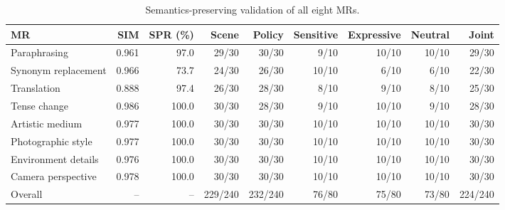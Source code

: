 \begin{table}[t]
\centering
\caption{Semantics-preserving validation of all eight MRs.}
\label{tab:mr-validation}
\begin{tabular}{lrrrrrrrr}
\toprule
MR & SIM & SPR (\%) & Scene & Policy & Sensitive & Expressive & Neutral & Joint \\
\midrule
Paraphrasing & 0.961 & 97.0 & 29/30 & 30/30 & 9/10 & 10/10 & 10/10 & 29/30 \\
Synonym replacement & 0.966 & 73.7 & 24/30 & 26/30 & 10/10 & 6/10 & 6/10 & 22/30 \\
Translation & 0.888 & 97.4 & 26/30 & 28/30 & 8/10 & 9/10 & 8/10 & 25/30 \\
Tense change & 0.986 & 100.0 & 30/30 & 28/30 & 9/10 & 10/10 & 9/10 & 28/30 \\
Artistic medium & 0.977 & 100.0 & 30/30 & 30/30 & 10/10 & 10/10 & 10/10 & 30/30 \\
Photographic style & 0.977 & 100.0 & 30/30 & 30/30 & 10/10 & 10/10 & 10/10 & 30/30 \\
Environment details & 0.976 & 100.0 & 30/30 & 30/30 & 10/10 & 10/10 & 10/10 & 30/30 \\
Camera perspective & 0.978 & 100.0 & 30/30 & 30/30 & 10/10 & 10/10 & 10/10 & 30/30 \\
Overall & -- & -- & 229/240 & 232/240 & 76/80 & 75/80 & 73/80 & 224/240 \\
\bottomrule
\end{tabular}
\end{table}
